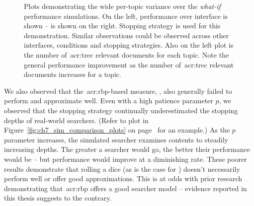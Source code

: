 \begin{figure}[t!]
    \centering
    \caption[Per-topic performance variation example]{Plots demonstrating the wide per-topic variance over the \emph{what-if} performance simulations. On the left, performance over interface  is shown –  is shown on the right. Stopping strategy  is used for this demonstration. Similar observations could be observed across other interfaces, conditions and stopping strategies. Also  on the left plot is the number of~\gls{acr:trec} relevant documents for each topic. Note the general performance improvement as the number of~\gls{acr:trec} relevant documents increases for a topic.}
    \label{fig:per_topic_differences}
\end{figure}

We also observed that the~\gls{acr:rbp}-based measure, , also generally failed to perform and approximate well. Even with a high patience parameter $p$, we observed that the stopping strategy continually underestimated the stopping depths of real-world searchers. (Refer to plot  in Figure~\ref{fig:ch7_sim_comparison_plots} on page~\pageref{fig:ch7_sim_comparison_plots} for an example.) As the $p$ parameter increases, the simulated searcher examines contents to steadily increasing depths. The greater a searcher would go, the better their performance would be -- but performance would improve at a diminishing rate. These poorer results demonstrate that rolling a dice (as is the case for ) doesn't necessarily perform well or offer good approximations. This is at odds with prior research demonstrating that~\gls{acr:rbp} offers a good searcher model -- evidence reported in this thesis suggests to the contrary.

